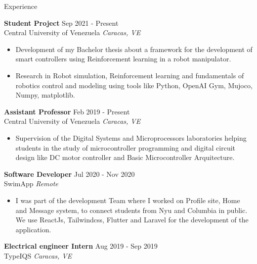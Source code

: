 \documentclass{resume} %
\begin{document}
\begin{rSection}{Experience} %

    \textbf{Student Project} \hfill Sep 2021 - Present\\
    Central University of Venezuela \hfill \textit{Caracas, VE}
    \begin{itemize}

        \item Development of my Bachelor thesis about a framework for the 
        development of smart controllers using Reinforcement learning in a robot 
        manipulator.

        \item Research in Robot simulation, Reinforcement learning and 
        fundamentals of robotics control and modeling using tools like 
        Python, OpenAI Gym, Mujoco, Numpy, matplotlib.

    \end{itemize}

    \textbf{Assistant Professor} \hfill Feb 2019 - Present\\
    Central University of Venezuela \hfill \textit{Caracas, VE}
    \begin{itemize}

        \item Supervision of the Digital Systems and Microprocessors 
        laboratories helping students in the study of microcontroller 
        programming and digital circuit design like DC motor controller and 
        Basic Microcontroller Arquitecture. 

    \end{itemize}


    \textbf{Software Developer} \hfill Jul 2020 - Nov 2020\\
    SwimApp \hfill \textit{Remote}
    \begin{itemize}

        \item I was part of the development Team where I worked on Profile site,
        Home and Message system, to connect students from Nyu and Columbia in 
        public. We use ReactJs, Tailwindcss, Flutter and Laravel for the 
        development of the application.

    \end{itemize}

    \textbf{Electrical engineer Intern} \hfill Aug 2019 - Sep 2019\\
    TypeIQS \hfill \textit{Caracas, VE}
    \begin{itemize}


\end{itemize}
\end{rSection}
\end{document}
